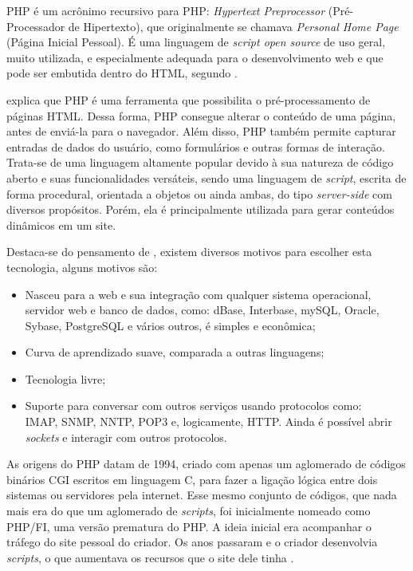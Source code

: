 PHP é um acrônimo recursivo para PHP: \textit{Hypertext Preprocessor} (Pré-Processador de Hipertexto), que originalmente se chamava \textit{Personal Home Page} (Página Inicial Pessoal). É uma linguagem de \textit{script open source} de uso geral, muito utilizada, e especialmente adequada para o desenvolvimento web e que pode ser embutida dentro do HTML, segundo . %

 explica que PHP é uma ferramenta que possibilita o pré-processamento de páginas HTML. Dessa forma, PHP consegue alterar o conteúdo de uma página, antes de enviá-la para o navegador. Além disso, PHP também permite capturar entradas de dados do usuário, como formulários e outras formas de interação. Trata-se de uma linguagem altamente popular devido à sua natureza de código aberto e suas funcionalidades versáteis, sendo uma linguagem de \textit{script}, escrita de forma procedural, orientada a objetos ou ainda ambas, do tipo \textit{server-side} com diversos propósitos. Porém, ela é principalmente utilizada para gerar conteúdos dinâmicos em um site.

Destaca-se do pensamento de , existem diversos motivos para escolher esta tecnologia, alguns motivos são:

\begin{itemize}
    \item Nasceu para a web e sua integração com qualquer sistema operacional, servidor web e banco de dados, como: dBase, Interbase, mySQL, Oracle, Sybase, PostgreSQL e vários outros, é simples e econômica;
    \item Curva de aprendizado suave, comparada a outras linguagens;
    \item Tecnologia livre;
    \item Suporte para conversar com outros serviços usando protocolos como: \\ IMAP, SNMP, NNTP, POP3 e, logicamente, HTTP. Ainda é possível abrir \textit{sockets} e interagir com outros protocolos.
\end{itemize}

As origens do PHP datam de 1994, criado com apenas um aglomerado de códigos binários CGI escritos em linguagem C, para fazer a ligação lógica entre dois sistemas ou servidores pela internet. Esse mesmo conjunto de códigos, que nada mais era do que um aglomerado de \textit{scripts}, foi inicialmente nomeado como PHP/FI, uma versão prematura do PHP. A ideia inicial era acompanhar o tráfego do site pessoal do criador. Os anos passaram e o criador desenvolvia \textit{scripts}, o que aumentava os recursos que o site dele tinha \cite{phpdevelopment}.

